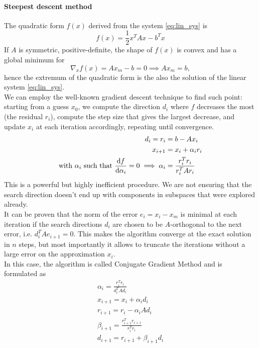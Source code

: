 \paragraph{Steepest descent method}
The quadratic form $f(x)$ derived from the system \eqref{eq:lin_sys} is
\begin{equation}
    \label{eq:quad_form}
    f(x) = \frac 1 2 x^T A x - b^T x
\end{equation}
If $A$ is symmetric, positive-definite, the shape of $f(x)$ is convex and has a global minimum for
\begin{equation}
    \label{eq:quad_form_min}
    \nabla_x f(x) = A x_m - b = 0 \implies A x_m = b,
\end{equation}
hence the extremum of the quadratic form is the also the solution of the linear system \eqref{eq:lin_sys}.
\\We can employ the well-known gradient descent technique \cite{PainlessCGM} to find such point: starting from a guess $x_0$, we compute the direction $d_i$ where $f$ decreases the most (the residual $r_i$), compute the step size that gives the largest decrease, and update $x_i$ at each iteration accordingly, repeating until convergence.
\begin{align}
d_i = r_i &= b - A x_i \\
x_{i+1} &= x_i +\alpha_i r_i \\
\text{with } \alpha_i \text{ such that } \dv{f}{\alpha_i} = 0 \implies \alpha_i &= \frac{r_i^T r_i}{r_i^T A r_i}
\end{align}
This is a powerful but highly inefficient procedure. We are not ensuring that the search direction doesn't end up with components in subspaces that were explored already.
\\It can be proven \cite{PainlessCGM} that the norm of the error $e_i = x_i - x_m$ is minimal at each iteration if the search directions $d_i$ are chosen to be $A$-orthogonal to the next error, i.e. $d_i^T A e_{i+1} = 0$. This makes the algorithm converge at the exact solution in $n$ steps, but most importantly it allows to truncate the iterations without a large error on the approximation $x_i$.
\\In this case, the algorithm is called Conjugate Gradient Method and is formulated as 
\begin{align}
    \label{eq:cg_method}
    \alpha_i = \frac{r_i^T r_i}{d_i^T A d_i}  
    \\x_{i+1} = x_i + \alpha_i d_i
    \\r_{i+1} = r_i - \alpha_i A d_i
    \\\beta_{i+1} = \frac{r_{i+1}^T r_{i+1}}{r_i^T r_i}
    \\d_{i+1} = r_{i+1} + \beta_{i+1} d_i
\end{align}
